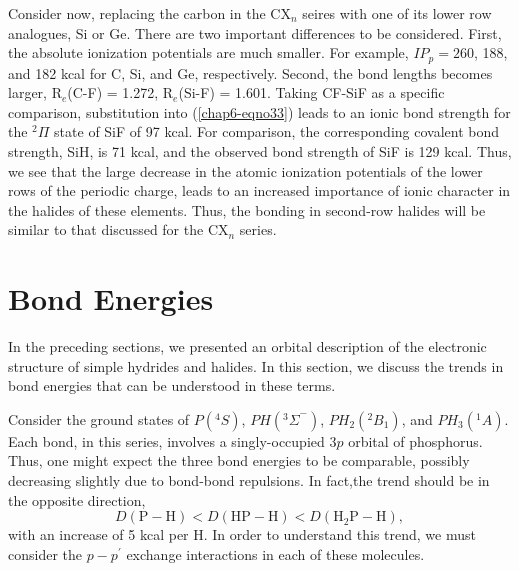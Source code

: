 Consider now, replacing the carbon in the CX$_n$ seires with one of
its lower row analogues, Si or Ge.  There are two important
differences to be considered.  First, the absolute ionization
potentials are much smaller.  For example, $IP_p = 260$, 188, and 182
kcal for C, Si, and Ge, respectively.  Second, the bond lengths
becomes larger, R$_e$(C-F) = 1.272, R$_e$(Si-F) = 1.601.  Taking
CF-SiF as a specific comparison, substitution into
(\ref{chap6-eqno33}) leads to an ionic bond strength for the ${^2\Pi}$
state of SiF of 97 kcal.  For comparison, the corresponding covalent
bond strength, SiH, is 71 kcal, and the observed bond strength of SiF
is 129 kcal.  Thus, we see that the large decrease in the atomic
ionization potentials of the lower rows of the periodic charge, leads
to an increased importance of ionic character in the halides of these
elements.  Thus, the bonding in second-row halides will be similar to
that discussed for the CX$_n$ series.

\section{Bond Energies}

In the preceding sections, we presented an orbital description of 
the electronic structure of simple hydrides and halides. In this 
section, we discuss the trends in bond energies that can be understood 
in these terms.

Consider the ground states of $P({^4S})$, $PH({^3\Sigma}^-)$, 
$PH_2({^2B}_1)$, and $PH_3 ({^1A})$.  Each bond, in this series, involves 
a singly-occupied $3p$ orbital of phosphorus. Thus, one might expect the three
bond energies to be comparable, possibly decreasing slightly due to
bond-bond repulsions. In fact,the trend should be in the opposite direction,
\begin{equation}
D(\mathrm{P-H}) < D(\mathrm{HP-H}) < D(\mathrm{H_2P-H}),
\end{equation}
with an increase of 5 kcal per H.  In order to understand this trend, 
we must consider the $p-p^{\prime}$ exchange
interactions in each of these molecules.

